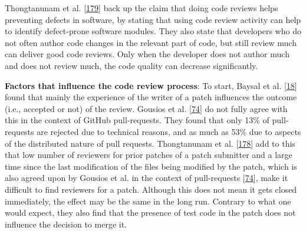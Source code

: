 \documentclass[]{book}
\begin{document}
Thongtanunam et al.
{[}\protect\hyperlink{ref-thongtanunam2016revisiting}{179}{]} back up
the claim that doing code reviews helps preventing defects in software,
by stating that using code review activity can help to identify
defect-prone software modules. They also state that developers who do
not often author code changes in the relevant part of code, but still
review much can deliver good code reviews. Only when the developer does
not author much and does not review much, the code quality can decrease
significantly.

\textbf{Factors that influence the code review process}: To start,
Baysal et al. {[}\protect\hyperlink{ref-baysal2016investigating}{18}{]}
found that mainly the experience of the writer of a patch influences the
outcome (i.e., accepted or not) of the review. Gousios et al.
{[}\protect\hyperlink{ref-gousios2014exploratory}{74}{]} do not fully
agree with this in the context of GitHub pull-requests. They found that
only 13\% of pull-requests are rejected due to technical reasons, and as
much as 53\% due to aspects of the distributed nature of pull requests.
Thongtanunam et al.
{[}\protect\hyperlink{ref-thongtanunam2017review}{178}{]} add to this
that low number of reviewers for prior patches of a patch submitter and
a large time since the last modification of the files being modified by
the patch, which is also agreed upon by Gousios et al. in the context of
pull-requests {[}\protect\hyperlink{ref-gousios2014exploratory}{74}{]},
make it difficult to find reviewers for a patch. Although this does not
mean it gets closed immediately, the effect may be the same in the long
run. Contrary to what one would expect, they also find that the presence
of test code in the patch does not influence the decision to merge it.
\end{document}

